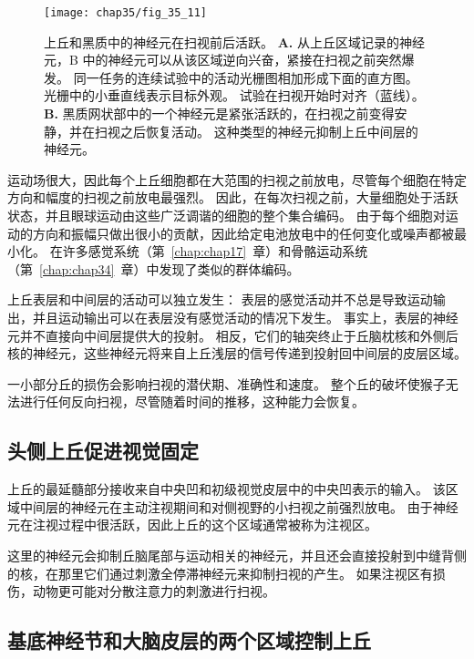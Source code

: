 \begin{figure}[htbp]
	\centering
	\texttt{[image: chap35/fig\_35\_11]}
	\caption{上丘和黑质中的神经元在扫视前后活跃\cite{hikosaka1989functional}。
		\textbf{A.} 从上丘区域记录的神经元，B 中的神经元可以从该区域逆向兴奋，紧接在扫视之前突然爆发。
		同一任务的连续试验中的活动光栅图相加形成下面的直方图。
		光栅中的小垂直线表示目标外观。
		试验在扫视开始时对齐（蓝线）。
		\textbf{B.} 黑质网状部中的一个神经元是紧张活跃的，在扫视之前变得安静，并在扫视之后恢复活动。
		这种类型的神经元抑制上丘中间层的神经元。}
	\label{fig:35_11}
\end{figure}


运动场很大，因此每个上丘细胞都在大范围的扫视之前放电，尽管每个细胞在特定方向和幅度的扫视之前放电最强烈。
因此，在每次扫视之前，大量细胞处于活跃状态，并且眼球运动由这些广泛调谐的细胞的整个集合编码。
由于每个细胞对运动的方向和振幅只做出很小的贡献，因此给定电池放电中的任何变化或噪声都被最小化。
在许多感觉系统（第~\ref{chap:chap17}~章）和骨骼运动系统（第~\ref{chap:chap34}~章）中发现了类似的群体编码。


上丘表层和中间层的活动可以独立发生：
表层的感觉活动并不总是导致运动输出，并且运动输出可以在表层没有感觉活动的情况下发生。
事实上，表层的神经元并不直接向中间层提供大的投射。
相反，它们的轴突终止于丘脑枕核和外侧后核的神经元，这些神经元将来自上丘浅层的信号传递到投射回中间层的皮层区域。


一小部分丘的损伤会影响扫视的潜伏期、准确性和速度。
整个丘的破坏使猴子无法进行任何反向扫视，尽管随着时间的推移，这种能力会恢复。



\subsection{头侧上丘促进视觉固定}

上丘的最延髓部分接收来自中央凹和初级视觉皮层中的中央凹表示的输入。
该区域中间层的神经元在主动注视期间和对侧视野的小扫视之前强烈放电。
由于神经元在注视过程中很活跃，因此上丘的这个区域通常被称为注视区。


这里的神经元会抑制丘脑尾部与运动相关的神经元，并且还会直接投射到中缝背侧的核，在那里它们通过刺激全停滞神经元来抑制扫视的产生。
如果注视区有损伤，动物更可能对分散注意力的刺激进行扫视。



\subsection{基底神经节和大脑皮层的两个区域控制上丘}

